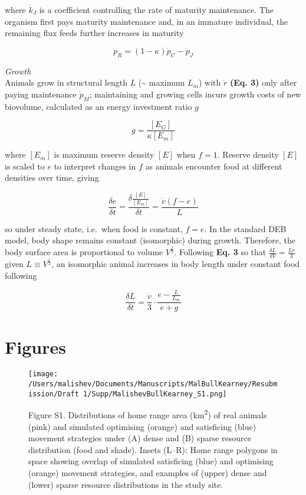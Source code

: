 \documentclass[]{article}
\let\oldsubparagraph\subparagraph
\renewcommand{\subparagraph}[1]{\oldsubparagraph{#1}\mbox{}}
\begin{document}
where \(\dot{k}_J\) is a coefficient controlling the rate of maturity
maintenance. The organism first pays maturity maintenance and, in an
immature individual, the remaining flux feeds further increases in
maturity

\[
  \dot{p}_R = (1 - \kappa)\dot{p}_C - \dot{p}_J
\]

\emph{Growth}\\
Animals grow in structural length \(L\) (\textasciitilde{} maximum
\(L_m\)) with \(\dot{r}\) \textbf{(Eq. 3)} only after paying maintenance
\(\dot{p}_M\); maintaining and growing cells incurs growth costs of new
biovolume, calculated as an energy investment ratio \(g\)

\[
  g = \frac
  {[E_G]}
  {\kappa[E_m]}
\]

where \([E_m]\) is maximum reserve density \([E]\) when \(f = 1\).
Reserve density \([E]\) is scaled to \(e\) to interpret changes in \(f\)
as animals encounter food at different densities over time, giving

\[
  \frac
    {\delta e}
    {\delta t} 
    = \frac
      {\delta \frac
        {[E]}
        {[E_m]}
        }
      {\delta t}
      = \frac
      {\dot{v}(f - e)}
      {L}
\]

so under steady state, i.e.~when food is constant, \(f = e\). In the
standard DEB model, body shape remains constant (isomorphic) during
growth. Therefore, the body surface area is proportional to volume
\(V^\frac{2}{3}\). Following \textbf{Eq. 3} so that
\(\frac{\delta L}{\delta V} = \frac {L\dot{r}}{3}\) given
\(L \equiv V^\frac{1}{3}\), an isomorphic animal increases in body
length under constant food following

\[
  \frac 
    {\delta L}
    {\delta t}
    = \frac
      {\dot{v}}
      {3} \cdot \frac 
        {e - \frac
          {L}
          {L_m}
        }
        {e + g}
\]

\subparagraph{}\label{section-7}

\section{Figures}\label{figures}

\begin{figure}
\centering
\texttt{[image: /Users/malishev/Documents/Manuscripts/MalBullKearney/Resubmission/Draft 1/Supp/MalishevBullKearney\_S1.png]}
\caption{Figure S1. Distributions of home range area
(km\textsuperscript{2}) of real animals (pink) and simulated optimising
(orange) and satisficing (blue) movement strategies under (A) dense and
(B) sparse resource distribution (food and shade). Insets (L--R): Home
range polygons in space showing overlap of simulated satisficing (blue)
and optimising (orange) movement strategies, and examples of (upper)
dense and (lower) sparse resource distributions in the study site.}
\end{figure}
\end{document}
